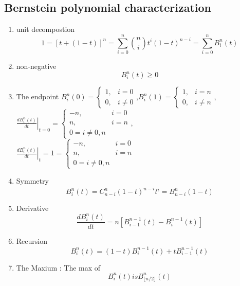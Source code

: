 \subsection{Bernstein polynomial characterization}

\begin{enumerate}
	\item unit decompostion \begin{equation*}
		      1 = \left[t+(1-t)\right]^n = \sum\limits_{i=0}^{n}\binom{n}{i}t^i(1-t)^{n-i} = \sum\limits_{i=0}^{n}B_i^n(t)
	      \end{equation*}
	\item non-negative \begin{equation*}
		      B_i^n(t)\geq 0
	      \end{equation*}
	\item The endpoint $B_{i}^{n}(0) = \begin{cases}
			      1 , & i = 0    \\
			      0 , & i \neq 0
		      \end{cases}$,\quad$B_{i}^{n}(1)=\begin{cases}
			      1 , & i = n    \\
			      0 , & i \neq n
		      \end{cases}$,$\left. \frac{dB_i^n(t)}{dt}\right|_{t=0}=\begin{cases}
			      -n , & i = 0 \\
			      n ,  & i = n \\
			      0 = i \neq 0,n
		      \end{cases}$,\\$\left. \frac{d B_{i}^{n}(t)}{dt}\right|_t=1 = \begin{cases}
		      -n , & i = 0 \\
		      n ,  & i = n \\
		      0 = i \neq 0,n
	      \end{cases}$
	\item Symmetry \begin{equation*}
		      B_{i}^{n}(t) = C_{n-i}^{n}(1-t)^{n-i}t^{i} = B_{n-i}^{n}(1-t)
	      \end{equation*}
	\item Derivative \begin{equation*}
		      \frac{d B_{i}^{n}(t)}{dt} = n\left[B_{i-1}^{n-1}(t)-B_{i}^{n-1}(t)\right]
	      \end{equation*}
	\item Recursion \begin{equation*}
		      B_{i}^{n}(t) = (1-t)B_{i}^{n-1}(t)+tB_{i-1}^{n-1}(t)
	      \end{equation*}
	\item The Maxium : The max of \begin{equation*}
		      B_{i}^{n}(t) is B_{\lfloor n/2 \rfloor}^{n}(t)
	      \end{equation*}


\end{enumerate}
